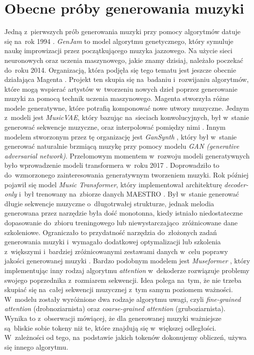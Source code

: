 \documentclass[data-science]{agh-wi} %
\begin{document}
\section{Obecne próby generowania muzyki}
Jedną z~pierwszych prób generowania muzyki przy pomocy algorytmów datuje się na~rok 1994 \cite{GenJam}. \textit{GenJam} to model algorytmu genetycznego, który symuluje naukę improwizacji przez początkującego muzyka jazzowego. Na użycie sieci neuronowych oraz uczenia maszynowego, jakie znamy dzisiaj, należało poczekać do~roku 2014. Organizacją, która podjęła się tego tematu jest jeszcze obecnie działająca Magenta \cite*{magenta}. Projekt ten skupia się na~badaniu i~rozwijaniu algorytmów, które mogą wspierać artystów w~tworzeniu nowych dzieł poprzez generowanie muzyki za pomocą technik uczenia maszynowego. Magenta stworzyła różne modele generatywne, które potrafią komponować nowe utwory muzyczne. Jednym z~modeli jest \textit{MusicVAE}, który bazując na~sieciach konwolucyjnych, był w~stanie generować sekwencje muzyczne, oraz interpolować pomiędzy nimi \cite*{musicvae}. Innym modelem stworzonym przez tę organizację jest \textit{GanSynth} \cite*{engel2018gansynth}, który był w~stanie generować naturalnie brzmiącą muzykę przy pomocy modelu \textit{GAN (generative adversarial network)}. Przełomowym momentem w~rozwoju modeli generatywnych było wprowadzenie modeli transformera w~roku 2017 \cite*{attention}. Doprowadziło to do~wzmorzonego zainteresowania generatywnym tworzeniem muzyki. Rok później pojawił się model \textit{Music Transformer}, który implementował architekturę \textit{decoder-only} i~był trenowany na~zbiorze danych MAESTRO \cite*{huang2018music}. Był w~stanie generować długie sekwencje muzyczne o~długotrwałej strukturze, jednak melodia generowana przez narzędzie była dość monotonna, kiedy istniało niedostateczne dopasowanie do~zbioru treningowego lub niewystarczająco~zróżnicowane dane szkoleniowe. Ograniczało to przydatność narzędzia do~złożonych zadań generowania muzyki i~wymagało dodatkowej optymalizacji lub szkolenia z~większymi i~bardziej zróżnicowanymi zestawami danych w~celu poprawy jakości generowanej muzyki \cite*{zhu2023survey}. Bardzo podobnym modelem jest \textit{Museformer} \cite*{yu2022museformer}, który implementując inny rodzaj algorytmu \textit{attention} w~dekoderze rozwiązuje problemy swojego poprzednika z~rozmiarem sekwencji. Idea polega na~tym, że nie trzeba skupiać się na~całej sekwencji muzycznej z~tym samym poziomem ważności. W~modelu zostały wyróżnione dwa rodzaje algorytmu uwagi, czyli \textit{fine-grained attention} (drobnoziarnista) oraz \textit{coarse-grained attention} (gruboziarnista). Wynika to z~obserwacji mówiącej, że dla generowanej muzyki ważniejsze są~bliskie sobie tokeny niż te, które znajdują się w~większej odległości. W~zależności od tego, na~podstawie jakich tokenów dokonujemy obliczeń, używa się innego algorytmu.
\end{document}
